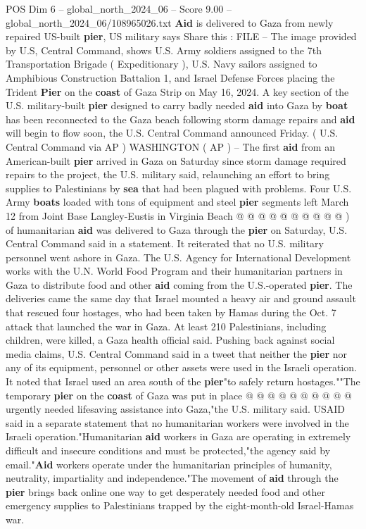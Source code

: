 \begin{textsample}{POS Dim 6 – global\_north\_2024\_06 – Score 9.00 – global\_north\_2024\_06/108965026.txt}  \label{ex:f6_pos_134}
\textbf{Aid} is delivered to Gaza from newly repaired US-built \textbf{pier}, US military says Share this : FILE -- The image provided by U.S, Central Command, shows U.S.
Army soldiers assigned to the 7th Transportation Brigade ( Expeditionary ), U.S.
Navy sailors assigned to Amphibious Construction Battalion 1, and Israel Defense Forces placing the Trident \textbf{Pier} on the \textbf{coast} of Gaza Strip on May 16, 2024.
A key section of the U.S. military-built \textbf{pier} designed to carry badly needed \textbf{aid} into Gaza by \textbf{boat} has been reconnected to the Gaza beach following storm damage repairs and \textbf{aid} will begin to flow soon, the U.S.
Central Command announced Friday. ( U.S.
Central Command via AP ) WASHINGTON ( AP ) -- The first \textbf{aid} from an American-built \textbf{pier} arrived in Gaza on Saturday since storm damage required repairs to the project, the U.S. military said, relaunching an effort to bring supplies to Palestinians by \textbf{sea} that had been plagued with problems.
Four U.S.
Army \textbf{boats} loaded with tons of equipment and steel \textbf{pier} segments left March 12 from Joint Base Langley-Eustis in Virginia Beach @ @ @ @ @ @ @ @ @ @ ) of humanitarian \textbf{aid} was delivered to Gaza through the \textbf{pier} on Saturday, U.S.
Central Command said in a statement.
It reiterated that no U.S. military personnel went ashore in Gaza.
The U.S.
Agency for International Development works with the U.N.
World Food Program and their humanitarian partners in Gaza to distribute food and other \textbf{aid} coming from the U.S.-operated \textbf{pier}.
The deliveries came the same day that Israel mounted a heavy air and ground assault that rescued four hostages, who had been taken by Hamas during the Oct. 7 attack that launched the war in Gaza.
At least 210 Palestinians, including children, were killed, a Gaza health official said.
Pushing back against social media claims, U.S.
Central Command said in a tweet that neither the \textbf{pier} nor any of its equipment, personnel or other assets were used in the Israeli operation.
It noted that Israel used an area south of the \textbf{pier}"to safely return hostages.""The temporary \textbf{pier} on the \textbf{coast} of Gaza was put in place @ @ @ @ @ @ @ @ @ @ urgently needed lifesaving assistance into Gaza,"the U.S. military said.
USAID said in a separate statement that no humanitarian workers were involved in the Israeli operation."Humanitarian \textbf{aid} workers in Gaza are operating in extremely difficult and insecure conditions and must be protected,"the agency said by email."\textbf{Aid} workers operate under the humanitarian principles of humanity, neutrality, impartiality and independence."The movement of \textbf{aid} through the \textbf{pier} brings back online one way to get desperately needed food and other emergency supplies to Palestinians trapped by the eight-month-old Israel-Hamas war.

\end{textsample}
